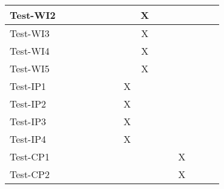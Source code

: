 \documentclass[12pt, titlepage]{article}
\begin{document}
\begin{table}[H]
\begin{adjustwidth}{-0.3in}{-0.5in}
{\begin{tabular}{c|c|c|c|c|c|c|c|c|c|c|c|c|c|c|}
\multicolumn{1}{|l|}{{Test-WI2}}   &             &             &             &             &             &             &             &    X         &              &              &              &             &  &                    \\ \hline
\multicolumn{1}{|l|}{{Test-WI3}}   &             &             &             &             &             &             &             &    X         &              &              &              &             &  &                    \\ \hline
\multicolumn{1}{|l|}{{Test-WI4}}   &             &             &             &             &             &             &             &    X         &              &              &              &             &  &                    \\ \hline
\multicolumn{1}{|l|}{{Test-WI5}}   &             &             &             &             &             &             &             &    X         &              &              &              &             &  &                    \\ \hline
\multicolumn{1}{|l|}{{Test-IP1}}   &             &             &             &             &             &             &      X       &             &              &              &              &             &  &                    \\ \hline
\multicolumn{1}{|l|}{{Test-IP2}}   &             &             &             &             &             &             &       X      &             &              &              &              &             &  &                    \\ \hline
\multicolumn{1}{|l|}{{Test-IP3}}   &             &             &             &             &             &             &       X      &             &              &              &              &             &  &                    \\ \hline
\multicolumn{1}{|l|}{{Test-IP4}}   &             &             &             &             &             &             &       X      &             &              &              &              &             &  &                    \\ \hline
\multicolumn{1}{|l|}{{Test-CP1}}   &             &             &             &             &             &             &             &             &              &             &       X       &             &  &                    \\ \hline
\multicolumn{1}{|l|}{{Test-CP2}}   &             &             &             &             &             &             &            &             &              &             &       X       &             &  &                    \\ \hline

\end{tabular}}
\end{adjustwidth}
\end{table}
\end{document}
